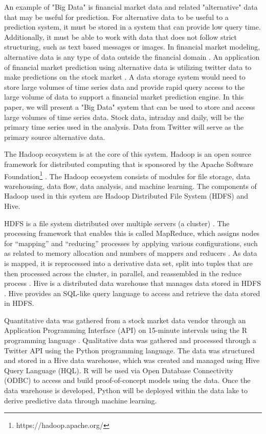 \documentclass[journal]{IEEEtran}
\begin{document}

An example of "Big Data" is financial market data and
 related "alternative" data that may be useful for prediction.
For alternative data to be useful to a prediction system,
 it must be stored in a system that can provide low query time.
Additionally, it must be able to work with data that does not follow strict structuring,
 such as text based messages or images.
In financial market modeling, alternative data is any type of data outside the
 financial domain \cite{xiao2018trading}.
An application of financial market prediction using alternative data is
 utilizing twitter data to make predictions on the stock market \cite{twittermood}.
A data storage system would need to store large volumes of time series data and
 provide rapid query access to the large volume of data to support a financial 
 market prediction engine.
In this paper, we will present a "Big Data" system that can be used to store and
 access large volumes of time series data. 
Stock data, intraday and daily,
 will be the primary time series used in the analysis.
Data from Twitter will serve as the primary source alternative data.


The Hadoop ecosystem is at the core of this system.
Hadoop is an open source framework for distributed computing
 that is sponsored by the 
 Apache Software Foundation\footnote{https://hadoop.apache.org/} \cite{HDFSarchitecture}.
The Hadoop ecosystem consists of modules for file storage, data warehousing,
 data flow, data analysis, and machine learning.
The components of Hadoop used in this system are
 Hadoop Distributed File System (HDFS) and Hive.

HDFS is a file system distributed over multiple servers (a cluster) \cite{HDFSarchitecture}.
The processing framework that enables this is called MapReduce, 
which assigns nodes for ``mapping'' and ``reducing'' processes by applying  
various configurations, such as related to memory allocation and numbers
of mappers and reducers \cite{MappingReducing}.
As data is mapped, it is reprocessed into a derivative data set,
split into tuples that are then processed across the cluster, in parallel,
and reassembled in the reduce process \cite{MappingReducing}.
Hive is a distributed data warehouse that manages data stored in HDFS \cite{HDFSarchitecture}.
Hive provides an SQL-like query language to access and
 retrieve the data stored in HDFS.

Quantitative data was gathered from a stock market data vendor through an
Application Programming Interface (API) on 15-minute intervals using the R
programming language \cite{R}. 
Qualitative data was gathered and processed through a Twitter API
using the Python programming language. 
The data was structured and stored in a Hive data warehouse, 
which was created and managed using Hive Query Language (HQL).
R will be used via Open Database Connectivity (ODBC) to access and
build proof-of-concept models using the data. 
Once the data warehouse is developed,
Python will be deployed within the data lake to
derive predictive data through machine learning.
\end{document}
